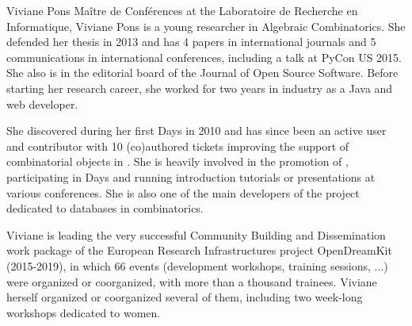 \begin{participant}[type=PI,PM=2,gender=female]{Viviane Pons}
  Maître de Conférences at the Laboratoire de Recherche en Informatique, Viviane Pons is a
  young researcher in Algebraic Combinatorics. She defended her thesis in 2013 and has 4
  papers in international journals and 5 communications in international
  conferences, including a talk at PyCon US 2015. 
  She also is in the editorial board of the Journal of Open Source Software.
  Before starting her research career,
  she worked for two years in industry as a Java and web developer.

  She discovered \Sage during her first \Sage Days in 2010 and has since been an active user
  and contributor with 10 (co)authored tickets improving the support of combinatorial
  objects in \Sage. She is heavily involved in the promotion of \Sage, participating in
  \Sage Days and running \Sage introduction tutorials or \Sage presentations at various
  conferences. She is also one of the main developers of the project 
  dedicated to databases in combinatorics.

  Viviane is leading the very successful Community Building and
  Dissemination work package of the European Research Infrastructures
  project OpenDreamKit (2015-2019), in which 66 events (development
  workshops, training sessions, ...) were organized or coorganized,
  with more than a thousand trainees. Viviane herself organized or
  coorganized several of them, including two week-long workshops
  dedicated to women.
\end{participant}
